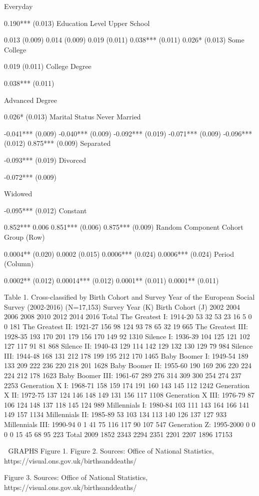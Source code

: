 Everyday



0.190***
(0.013)
Education Level
Upper School



0.013
(0.009)
0.014
(0.009)
0.019
(0.011)
0.038***
(0.011)
0.026*
(0.013)
Some College



0.019
(0.011)
College Degree



0.038***
(0.011)

Advanced Degree



0.026*
(0.013)
Marital Status
Never Married



-0.041***
(0.009)
-0.040***
(0.009)
-0.092***
(0.019)
-0.071***
(0.009)
-0.096***
(0.012)
0.875***
(0.009)
Separated



-0.093***
(0.019)
Divorced



-0.072***
(0.009)

Widowed



-0.095***
(0.012)
Constant

0.852***
0.006
0.851***
(0.006)
0.875***
(0.009)
Random Component
Cohort Group (Row)

0.0004**
(0.020)
0.0002
(0.015)
0.0006***
(0.024)
0.0006***
(0.024)
Period (Column)

0.0002**
(0.012)
0.00014***
(0.012)
0.0001**
(0.011)
0.0001**
(0.011)


Table 1. Cross-classified by Birth Cohort and Survey Year of the European Social Survey (2002-2016) (N=17,153)
Survey Year (K)
Birth Cohort (J)
2002
2004
2006
2008
2010
2012
2014
2016
Total
The Greatest I: 1914-20
53
32
53
23
16
5
0
0
181
The Greatest II: 1921-27
156
98
124
93
78
65
32
19
665
The Greatest III: 1928-35
193
170
201
179
156
170
149
92
1310
Silence I: 1936-39
104
125
121
102
127
117
91
81
868
Silence II: 1940-43
129
114
142
129
132
130
129
79
984
Silence III: 1944-48
168
131
212
178
199
195
212
170
1465
Baby Boomer I: 1949-54
189
133
209
222
236
220
218
201
1628
Baby Boomer II: 1955-60
190
169
206
220
224
224
212
178
1623
Baby Boomer III: 1961-67
289
276
314
309
300
254
274
237
2253
Generation X I: 1968-71
158
159
174
191
160
143
145
112
1242
Generation X II: 1972-75
137
124
146
148
149
131
156
117
1108
Generation X III: 1976-79
87
106
124
148
137
118
145
124
989
Millennials I: 1980-84
103
111
143
164
166
141
149
157
1134
Millennials II: 1985-89
53
103
134
113
140
126
137
127
933
Millennials III: 1990-94
0
1
41
75
116
117
90
107
547
Generation Z: 1995-2000
0
0
0
0
15
45
68
95
223
Total
2009
1852
2343
2294
2351
2201
2207
1896
17153


GRAPHS
Figure 1.
Figure 2.
Sources: Office of National Statistics, https://visual.ons.gov.uk/birthsanddeaths/

Figure 3.
Sources: Office of National Statistics, https://visual.ons.gov.uk/birthsanddeaths/
